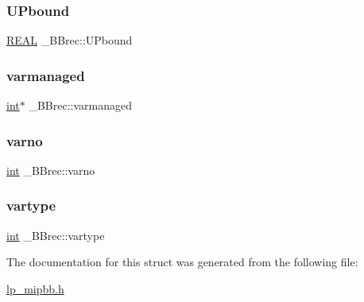\mbox{\label{struct___b_brec_ae8df277b07ca02fb36dbf6bc9eb35ce7}} 
\subsubsection{\texorpdfstring{U\+Pbound}{UPbound}}
{\footnotesize\ttfamily \hyperlink{lp__lib_8h_a92bd5e363d131fa73669358edb232dce}{R\+E\+AL} \+\_\+\+B\+Brec\+::\+U\+Pbound}

\mbox{\label{struct___b_brec_ab82daacc101bd04f051be1eb07da7ea2}} 
\subsubsection{\texorpdfstring{varmanaged}{varmanaged}}
{\footnotesize\ttfamily \hyperlink{lp__lib_8h_adeb9ec6400320e4923ac9d836d509ddb}{int}$\ast$ \+\_\+\+B\+Brec\+::varmanaged}

\mbox{\label{struct___b_brec_a9d3292fda60440da337bbd43bb0ecfad}} 
\subsubsection{\texorpdfstring{varno}{varno}}
{\footnotesize\ttfamily \hyperlink{lp__lib_8h_adeb9ec6400320e4923ac9d836d509ddb}{int} \+\_\+\+B\+Brec\+::varno}

\mbox{\label{struct___b_brec_a5e924799c0ff60e6524ea9efd6c55e7f}} 
\subsubsection{\texorpdfstring{vartype}{vartype}}
{\footnotesize\ttfamily \hyperlink{lp__lib_8h_adeb9ec6400320e4923ac9d836d509ddb}{int} \+\_\+\+B\+Brec\+::vartype}



The documentation for this struct was generated from the following file\+:\begin{DoxyCompactItemize}
\item 
\hyperlink{lp__mipbb_8h}{lp\+\_\+mipbb.\+h}\end{DoxyCompactItemize}
